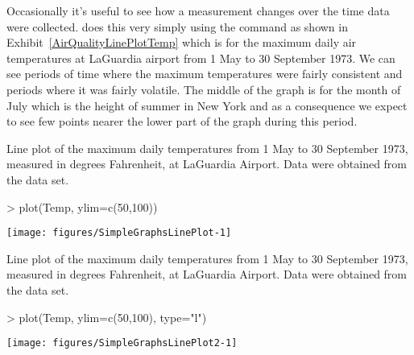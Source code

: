 Occasionally it's useful to see how a measurement changes over the time data were collected. \R{} does this very simply using the  command as shown in Exhibit~\ref{AirQualityLinePlotTemp} which is for the maximum daily air temperatures at LaGuardia airport from 1 May to 30 September 1973. We can see periods of time where the maximum temperatures were fairly consistent and periods where it was fairly volatile. The middle of the graph is for the month of July which is the height of summer in New York and as a consequence we expect to see few points nearer the lower part of the graph during this period. 
\begin{exhibit} 
\begin{center} 
\caption{Line plot of the maximum daily temperatures from 1 May to 30 September 1973, measured in degrees Fahrenheit, at LaGuardia Airport. Data were obtained from the  data set.} 
\label{AirQualityLinePlotTemp} 

\begin{Schunk}
\begin{Sinput}
> plot(Temp, ylim=c(50,100)) 
\end{Sinput}

\texttt{[image: figures/SimpleGraphsLinePlot-1]} \end{Schunk}

\end{center} 
\end{exhibit} 
\begin{exhibit} 
\begin{center} 
\caption{Line plot of the maximum daily temperatures from 1 May to 30 September 1973, measured in degrees Fahrenheit, at LaGuardia Airport. Data were obtained from the  data set.} 
\label{AirQualityLinePlotTemp2} 

\begin{Schunk}
\begin{Sinput}
> plot(Temp, ylim=c(50,100), type="l") 
\end{Sinput}

\texttt{[image: figures/SimpleGraphsLinePlot2-1]} \end{Schunk}

\end{center} 
\end{exhibit} 
 
 
